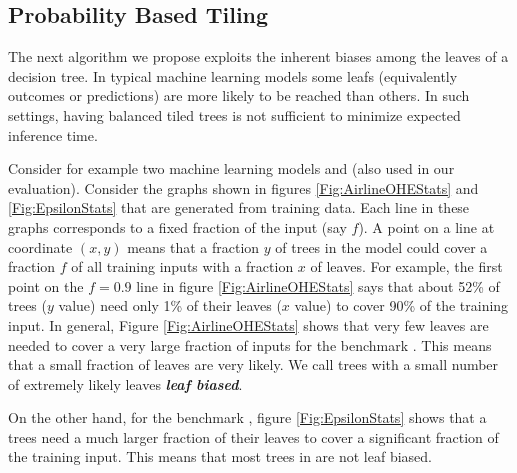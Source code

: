 \subsection{Probability Based Tiling}
\label{sec:ProbTiling}

The next algorithm we propose exploits the inherent biases among the leaves of a decision tree. In typical machine learning models some leafs (equivalently outcomes or predictions) are more likely to be reached than others. In such settings, having balanced tiled trees is not sufficient to minimize expected inference time. 

Consider for example two machine learning models  and  (also used in our evaluation). 
Consider the graphs shown in   
figures \ref{Fig:AirlineOHEStats} and \ref{Fig:EpsilonStats} that are generated from training data. Each line in these graphs corresponds to a fixed fraction of the input (say $f$). 
A point on a line at coordinate $(x, y)$ means that a fraction $y$ of trees in the model could cover a fraction $f$ of all training inputs with a fraction $x$ of 
leaves. For example, the first point on the $f=0.9$ line in figure \ref{Fig:AirlineOHEStats} says that about 52\% of trees ($y$ value) need only 1\% of their
leaves ($x$ value) to cover 90\% of the training input. 
In general, Figure \ref{Fig:AirlineOHEStats} shows that very few leaves are needed to cover a very large fraction of inputs for the benchmark . 
This means that a small fraction of leaves are very likely. 
We call trees with a small number of extremely likely leaves \textbf{\emph{leaf biased}}.

On the other hand, for the benchmark ,
figure \ref{Fig:EpsilonStats} shows that a trees need a much larger fraction of their leaves to cover a significant fraction of the training input.
This means that most trees in  are not leaf biased.

